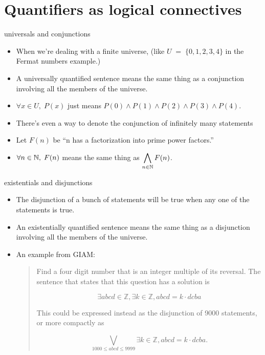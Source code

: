 \documentclass[landscape]{beamer}
\begin{document}
\section{Quantifiers as logical connectives}

\begin{frame}{universals and conjunctions}
\begin{itemize}
\item When we're dealing with a finite universe, (like $U \; = \; \{0,1,2,3,4\}$ in the Fermat numbers example.) \pause
\item A universally quantified sentence means the same thing as a conjunction involving all the members of the universe.\pause
\item $\forall x \in U, \; P(x)$ just means $P(0) \land P(1) \land P(2) \land P(3) \land P(4)$.\pause
\item There's even a way to denote the conjunction of infinitely many statements\pause 
\item Let $F(n)$ be ``n has a factorization into prime power factors.'' \pause
\item $\displaystyle \forall n \in {\mathbb N}, \; F(n)$ means the same thing as $\displaystyle \bigwedge_{n \in {\mathbb N}} F(n)$.
\end{itemize}
\end{frame}

\begin{frame}{existentials and disjunctions}
\begin{itemize}
\item The disjunction of a bunch of statements will be true when any one of the statements is true.\pause
\item An existentially quantified sentence means the same thing as a disjunction involving all the members of the universe.\pause
\item An example from GIAM:
\begin{quote}
Find a four digit number that
is an integer multiple of its reversal.  The sentence that states that this question has a solution is

\[
\exists abcd \in {\mathbb Z},  \exists k \in {\mathbb Z}, abcd = k\cdot dcba
\]

This could be expressed instead as the disjunction of 9000 statements, or more 
compactly as

\[
\bigvee_{1000\leq abcd \leq 9999}  \exists k \in {\mathbb Z}, abcd = k\cdot dcba.
\]

\end{quote}
\end{itemize}
\end{frame}
\end{document}
